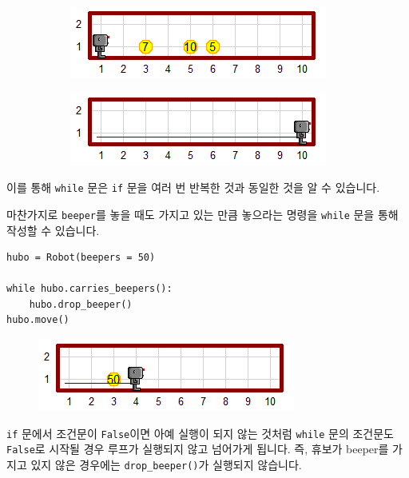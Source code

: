 \documentclass[../main.tex]{subfiles}
\begin{document}
\begin{figure}[H]
\centering
\begin{subfigure}{.5\textwidth}
\centering
\includegraphics[width=.9\linewidth]{"./lectures/lecture5_whilepickbeeper"}
\label{fig:lecture5whilepickbeeper}
\end{subfigure}%
\begin{subfigure}{.5\textwidth}
\centering
\includegraphics[width=.9\linewidth]{"./lectures/lecture5_pickbeeperaft"}
\label{fig:lecture5pickbeeperaft3}
\end{subfigure}
\end{figure}
이를 통해 \texttt{while} 문은 \texttt{if} 문을 여러 번 반복한 것과 동일한 것을 알 수 있습니다.

마찬가지로 \texttt{beeper}를 놓을 때도 가지고 있는 만큼 놓으라는 명령을 \texttt{while} 문을 통해 작성할 수 있습니다.
\begin{verbatim}
hubo = Robot(beepers = 50)

while hubo.carries_beepers():
    hubo.drop_beeper()
hubo.move()
\end{verbatim}
\begin{figure}[H]
\centering
\includegraphics[width=0.5\linewidth]{"./lectures/lecture5_whiledropbeeper"}
\label{fig:lecture5whiledropbeeper}
\end{figure}
\texttt{if} 문에서 조건문이 \texttt{False}이면 아예 실행이 되지 않는 것처럼 \texttt{while} 문의 조건문도 \texttt{False}로 시작될 경우 루프가 실행되지 않고 넘어가게 됩니다.
즉, 휴보가 beeper를 가지고 있지 않은 경우에는 \texttt{drop\_beeper()}가 실행되지 않습니다.
\end{document}
